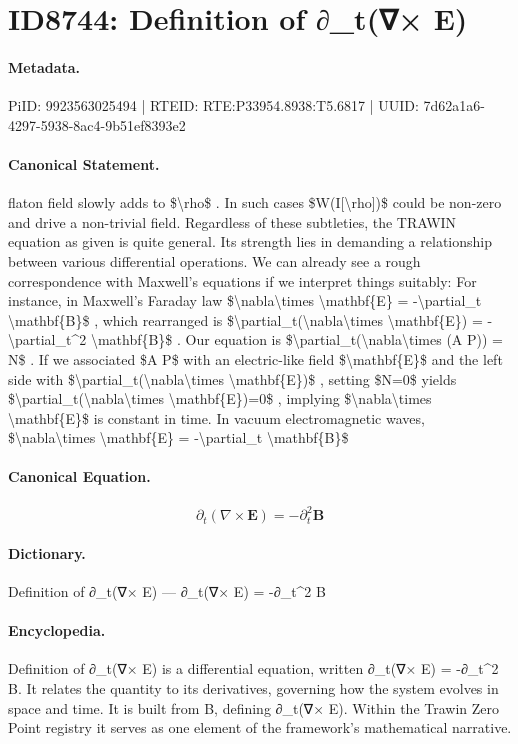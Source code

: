 \section*{ID8744: Definition of ∂\_t(∇× E)}
\paragraph{Metadata.}
PiID: 9923563025494 | RTEID: RTE:P33954.8938:T5.6817 | UUID: 7d62a1a6-4297-5938-8ac4-9b51ef8393e2

\paragraph{Canonical Statement.}
flaton field slowly adds to \$\textbackslash{}rho\$ . In such cases \$W(I[\textbackslash{}rho])\$ could be non-zero and drive a non-trivial field. Regardless of these subtleties, the TRAWIN equation as given is quite general. Its strength lies in demanding a relationship between various differential operations. We can already see a rough correspondence with Maxwell’s equations if we interpret things suitably: For instance, in Maxwell’s Faraday law \$\textbackslash{}nabla\textbackslash{}times \textbackslash{}mathbf\{E\} = -\textbackslash{}partial\_t \textbackslash{}mathbf\{B\}\$ , which rearranged is \$\textbackslash{}partial\_t(\textbackslash{}nabla\textbackslash{}times \textbackslash{}mathbf\{E\}) = -\textbackslash{}partial\_t\textasciicircum{}2 \textbackslash{}mathbf\{B\}\$ . Our equation is \$\textbackslash{}partial\_t(\textbackslash{}nabla\textbackslash{}times (A P)) = N\$ . If we associated \$A P\$ with an electric-like field \$\textbackslash{}mathbf\{E\}\$ and the left side with \$\textbackslash{}partial\_t(\textbackslash{}nabla\textbackslash{}times \textbackslash{}mathbf\{E\})\$ , setting \$N=0\$ yields \$\textbackslash{}partial\_t(\textbackslash{}nabla\textbackslash{}times \textbackslash{}mathbf\{E\})=0\$ , implying \$\textbackslash{}nabla\textbackslash{}times \textbackslash{}mathbf\{E\}\$ is constant in time. In vacuum electromagnetic waves, \$\textbackslash{}nabla\textbackslash{}times \textbackslash{}mathbf\{E\} = -\textbackslash{}partial\_t \textbackslash{}mathbf\{B\}\$

\paragraph{Canonical Equation.}
\[
\partial_t(\nabla\times \mathbf{E}) = -\partial_t^2 \mathbf{B}
\]

\paragraph{Dictionary.}
Definition of ∂\_t(∇× E) — ∂\_t(∇× E) = -∂\_t\textasciicircum{}2 B

\paragraph{Encyclopedia.}
Definition of ∂\_t(∇× E) is a differential equation, written ∂\_t(∇× E) = -∂\_t\textasciicircum{}2 B. It relates the quantity to its derivatives, governing how the system evolves in space and time. It is built from B, defining ∂\_t(∇× E). Within the Trawin Zero Point registry it serves as one element of the framework's mathematical narrative.
